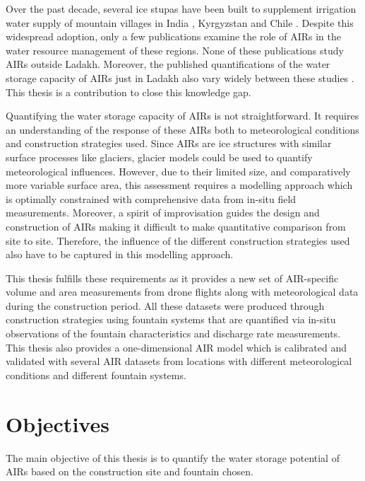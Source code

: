 Over the past decade, several ice stupas have been built to supplement irrigation water supply of mountain
villages in India \citep{wangchukIceStupaCompetition2020, palmerStoringFrozenWater2022,
aggarwalAdaptationClimateChange2021}, Kyrgyzstan \citep{bbcnewsBrightArtificialGlacier2020} and Chile
\citep{reutersConservationistsChileAim2021}. Despite this widespread adoption, only a few publications examine
the role of AIRs in the water resource management of these regions. None of these publications study AIRs
outside Ladakh. Moreover, the published quantifications of the water storage capacity of AIRs just in Ladakh
also vary widely between these studies \citep{norphelSnowWaterHarvesting2015, baglaArtificialGlaciersHelp1998}.
This thesis is a contribution to close this knowledge gap.

Quantifying the water storage capacity of AIRs is not straightforward. It requires an understanding of the
response of these AIRs both to meteorological conditions and construction strategies used. Since AIRs are ice
structures with similar surface processes like glaciers, glacier models could be used to quantify meteorological
influences. However, due to their limited size, and comparatively more variable surface area, this assessment
requires a modelling approach which is optimally constrained with comprehensive data from in-situ field
measurements. Moreover, a spirit of improvisation guides the design and construction of AIRs making it difficult
to make quantitative comparison from site to site. Therefore, the influence of the different construction
strategies used also have to be captured in this modelling approach. 

This thesis fulfills these requirements as it provides a new set of AIR-specific volume and area measurements
from drone flights along with meteorological data during the construction period. All these datasets were
produced through construction strategies using fountain systems that are quantified via in-situ observations of
the fountain characteristics and discharge rate measurements. This thesis also provides a one-dimensional AIR
model which is calibrated and validated with several AIR datasets from locations with different meteorological
conditions and different fountain systems.


\section{Objectives}

The main objective of this thesis is to quantify the water storage potential of AIRs based on the construction
site and fountain chosen. 

